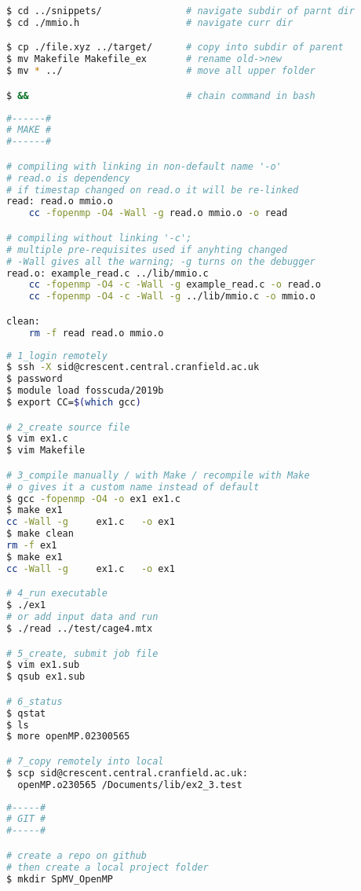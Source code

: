 \documentclass[8pt]{extarticle}
\begin{document}
\begin{small}
\begin{multicols}{2}
\begin{lstlisting}[language=bash]
$ cd ../snippets/				# navigate subdir of parnt dir
$ cd ./mmio.h					# navigate curr dir

$ cp ./file.xyz ../target/		# copy into subdir of parent
$ mv Makefile Makefile_ex		# rename old->new
$ mv * ../						# move all upper folder

$ &&							# chain command in bash
\end{lstlisting}

\begin{lstlisting}[language=bash]
#------#
# MAKE #
#------#

# compiling with linking in non-default name '-o'
# read.o is dependency
# if timestap changed on read.o it will be re-linked
read: read.o mmio.o
	cc -fopenmp -O4 -Wall -g read.o mmio.o -o read

# compiling without linking '-c'; 
# multiple pre-requisites used if anyhting changed
# -Wall gives all the warning; -g turns on the debugger
read.o: example_read.c ../lib/mmio.c
	cc -fopenmp -O4 -c -Wall -g example_read.c -o read.o
	cc -fopenmp -O4 -c -Wall -g ../lib/mmio.c -o mmio.o

clean:
	rm -f read read.o mmio.o

\end{lstlisting}


\begin{lstlisting}[language=bash]
# 1_login remotely
$ ssh -X sid@crescent.central.cranfield.ac.uk
$ password
$ module load fosscuda/2019b
$ export CC=$(which gcc)

# 2_create source file
$ vim ex1.c
$ vim Makefile

# 3_compile manually / with Make / recompile with Make
# o gives it a custom name instead of default
$ gcc -fopenmp -O4 -o ex1 ex1.c
$ make ex1
cc -Wall -g		ex1.c	-o ex1
$ make clean
rm -f ex1
$ make ex1
cc -Wall -g		ex1.c	-o ex1

# 4_run executable
$ ./ex1
# or add input data and run
$ ./read ../test/cage4.mtx

# 5_create, submit job file
$ vim ex1.sub
$ qsub ex1.sub

# 6_status
$ qstat
$ ls
$ more openMP.02300565

# 7_copy remotely into local
$ scp sid@crescent.central.cranfield.ac.uk:
  openMP.o230565 /Documents/lib/ex2_3.test
\end{lstlisting}


\begin{lstlisting}[language=bash]
#-----#
# GIT #
#-----#

# create a repo on github
# then create a local project folder
$ mkdir SpMV_OpenMP


\end{lstlisting}
\end{multicols}
\end{small}
\end{document}
